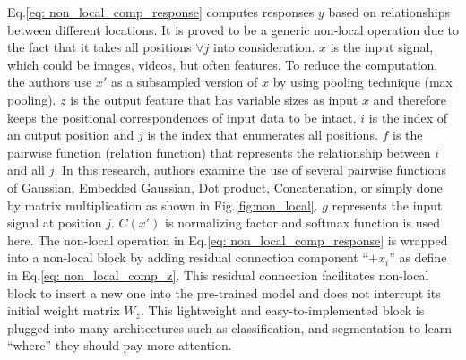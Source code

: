 Eq.\ref{eq: non_local_comp_response} computes responses $y$ based on relationships between different locations. It is proved to be a generic non-local operation due to the fact that it takes all positions $\forall j$ into consideration. $x$ is the input signal, which could be images, videos, but often features. To reduce the computation, the authors use $x'$ as a subsampled version of $x$ by using pooling technique (max pooling). $z$ is the output feature that has variable sizes as input $x$ and therefore keeps the positional correspondences of input data to be intact. $i$ is the index of an output position and $j$ is the index that enumerates all positions. $f$ is the pairwise function (relation function) that represents the relationship between $i$ and all $j$. In this research, authors examine the use of several pairwise functions of Gaussian, Embedded Gaussian, Dot product, Concatenation, or simply done by matrix multiplication as shown in Fig.\ref{fig:non_local}. $g$ represents the input signal at position $j$. $C(x')$ is normalizing factor and softmax function is used here. The non-local operation in Eq.\ref{eq: non_local_comp_response} is wrapped into a non-local block by adding residual connection component “$+x_{i}$” as define in Eq.\ref{eq: non_local_comp_z}. This residual connection facilitates non-local block to insert a new one into the pre-trained model and does not interrupt its initial weight matrix $W_z$. This lightweight and easy-to-implemented block is plugged into many architectures such as classification, and segmentation to learn “where” they should pay more attention.


